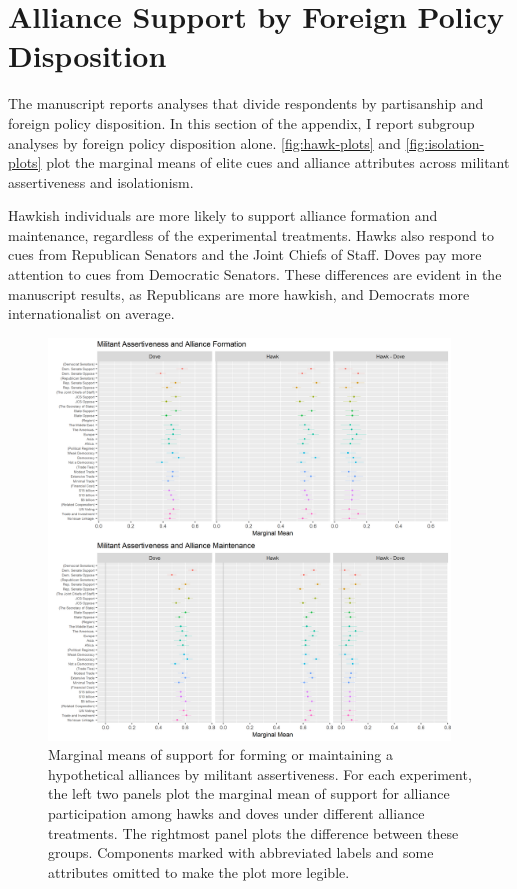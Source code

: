 \documentclass[12pt]{article}
\begin{document}
\section{Alliance Support by Foreign Policy Disposition} 


The manuscript reports analyses that divide respondents by partisanship and foreign policy disposition. 
In this section of the appendix, I report subgroup analyses by foreign policy disposition alone. 
\autoref{fig:hawk-plots} and \autoref{fig:isolation-plots} plot the marginal means of elite cues and alliance attributes across militant assertiveness and isolationism. 


Hawkish individuals are more likely to support alliance formation and maintenance, regardless of the experimental treatments. 
Hawks also respond to cues from Republican Senators and the Joint Chiefs of Staff. 
Doves pay more attention to cues from Democratic Senators.
These differences are evident in the manuscript results, as Republicans are more hawkish, and Democrats more internationalist on average. 


\begin{figure}
	\centering
		\includegraphics[width=0.95\textwidth]{hawk-plots.png}
	\caption{Marginal means of support for forming or maintaining a hypothetical alliances by militant assertiveness. For each experiment, the left two panels plot the marginal mean of support for alliance participation among hawks and doves under different alliance treatments. The rightmost panel plots the difference between these groups. Components marked with abbreviated labels and some attributes omitted to make the plot more legible.}
	\label{fig:hawk-plots}
\end{figure}
\end{document}
